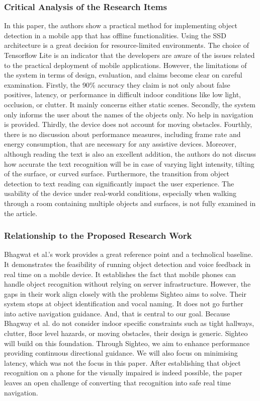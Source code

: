\documentclass{FastFyp}
\begin{document}
\subsubsection{Critical Analysis of the Research Items}  
In this paper, the authors show a practical method for implementing object detection in a mobile app that has offline functionalities. Using the SSD architecture is a great decision for resource-limited environments. The choice of Tensorflow Lite is an indicator that the developers are aware of the issues related to the practical deployment of mobile applications. However, the limitations of the system in terms of design, evaluation, and claims become clear on careful examination. Firstly, the 90\% accuracy they claim is not only about false positives, latency, or performance in difficult indoor conditions like low light, occlusion, or clutter. It mainly concerns either static scenes. Secondly, the system only informs the user about the names of the objects only. No help in navigation is provided. Thirdly, the device does not account for moving obstacles. Fourthly, there is no discussion about performance measures, including frame rate and energy consumption, that are necessary for any assistive devices. Moreover, although reading the text is also an excellent addition, the authors do not discuss how accurate the text recognition will be in case of varying light intensity, tilting of the surface, or curved surface. Furthermore, the transition from object detection to text reading can significantly impact the user experience. The usability of the device under real-world conditions, especially when walking through a room containing multiple objects and surfaces, is not fully examined in the article.
\subsubsection{Relationship to the Proposed Research Work}  
Bhagwat et al.’s \cite{ref:salunkhe2021android} work provides a great reference point and a technolical baseline. It demonstrates the feasibility of running object detection and voice feedback in real time on a mobile device. It establishes the fact that mobile phones can handle object recognition without relying on server infrastructure. However, the gaps in their work align closely with the problems Sighteo aims to solve. Their system stops at object identification and vocal naming. It does not go further into active navigation guidance. And, that is central to our goal. Because Bhagway et al. do not consider indoor specific constraints such as tight hallways, clutter, floor level hazards, or moving obstacles, their design is generic. Sighteo will build on this foundation. Through Sighteo, we aim to enhance performance providing continuous directional guidance. We will also focus on minimising latency, which was not the focus in this paper. After establishing that object recognition on a phone for the visually impaired is indeed possible, the paper leaves an open challenge of converting that recognition into safe real time navigation.
\end{document}
